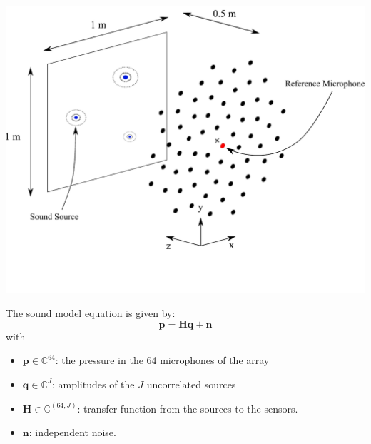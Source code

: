 \documentclass[12pt,pdftex,16x10]{elpres} %
\begin{document}
\begin{psli}
  \begin{minipage}[b][0.7\textheight][t]{0.5\textwidth}
    \centering
    \includegraphics[width=1\textwidth]{figs/full_measurement_setup.pdf}
  \end{minipage}
  \begin{minipage}[b][0.7\textheight][t]{0.5\textwidth}
    
    The sound model equation is given by:
    \begin{equation}
        \mathbf{p} = \mathbf{H} \mathbf{q} + \mathbf{n}
    \end{equation}
    with
    
    \begin{itemize}
     \item $\mathbf{p} \in \mathbb{C}^{64}$: the pressure in the 64 microphones of the array
     \item $\mathbf{q} \in \mathbb{C}^J$: amplitudes of the $J$ uncorrelated sources
     \item $\mathbf{H} \in \mathbb{C}^{(64,J)}$: transfer function from the sources to the sensors.
     \item $\mathbf{n}$: independent noise.
    \end{itemize}
  \end{minipage}
  
\end{psli}
\end{document}
